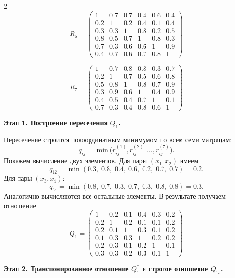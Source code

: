 \begin{multicols}{2}
\[
R_6 = \begin{pmatrix}
1 & 0.7 & 0.7 & 0.4 & 0.6 & 0.4 \\
0.2 & 1 & 0.2 & 0.4 & 0.1 & 0.4 \\
0.3 & 0.3 & 1 & 0.8 & 0.2 & 0.5 \\
0.8 & 0.5 & 0.7 & 1 & 0.8 & 0.3 \\
0.7 & 0.3 & 0.6 & 0.6 & 1 & 0.9 \\
0.4 & 0.7 & 0.6 & 0.7 & 0.8 & 1
\end{pmatrix}
\]

\[
R_7 = \begin{pmatrix}
1 & 0.7 & 0.8 & 0.8 & 0.3 & 0.7 \\
0.2 & 1 & 0.7 & 0.5 & 0.6 & 0.8 \\
0.5 & 0.8 & 1 & 0.8 & 0.7 & 0.9 \\
0.3 & 0.9 & 0.6 & 1 & 0.4 & 0.9 \\
0.4 & 0.5 & 0.4 & 0.7 & 1 & 0.1 \\
0.7 & 0.3 & 0.4 & 0.8 & 0.6 & 1
\end{pmatrix}
\]
\end{multicols}


\textbf{Этап 1. Построение пересечения $Q_1$.}

Пересечение строится покоординатным минимумом по всем семи матрицам:
\[
q_{ij} = \min\bigl(r^{(1)}_{ij}, r^{(2)}_{ij}, \ldots, r^{(7)}_{ij}\bigr).
\]
Покажем вычисление двух элементов. Для пары $(x_1, x_2)$ имеем:
\[
q_{12} = \min(0.3,\; 0.8,\; 0.4,\; 0.6,\; 0.2,\; 0.7,\; 0.7) = 0.2.
\]
Для пары $(x_3, x_4)$:
\[
q_{34} = \min(0.8,\; 0.7,\; 0.3,\; 0.7,\; 0.3,\; 0.8,\; 0.8) = 0.3.
\]
Аналогично вычисляются все остальные элементы. В результате получаем отношение
\[
Q_1 = \begin{pmatrix}
1 & 0.2 & 0.1 & 0.4 & 0.3 & 0.2 \\
0.2 & 1 & 0.2 & 0.1 & 0.1 & 0.2 \\
0.2 & 0.1 & 1 & 0.3 & 0.1 & 0.2 \\
0.1 & 0.3 & 0.3 & 1 & 0.2 & 0.2 \\
0.2 & 0.3 & 0.1 & 0.2 & 1 & 0.1 \\
0.3 & 0.3 & 0.2 & 0.3 & 0.1 & 1
\end{pmatrix}
\]


\textbf{Этап 2. Транспонированное отношение $Q_1^{*}$ и строгое отношение $Q_{1s}$.}

